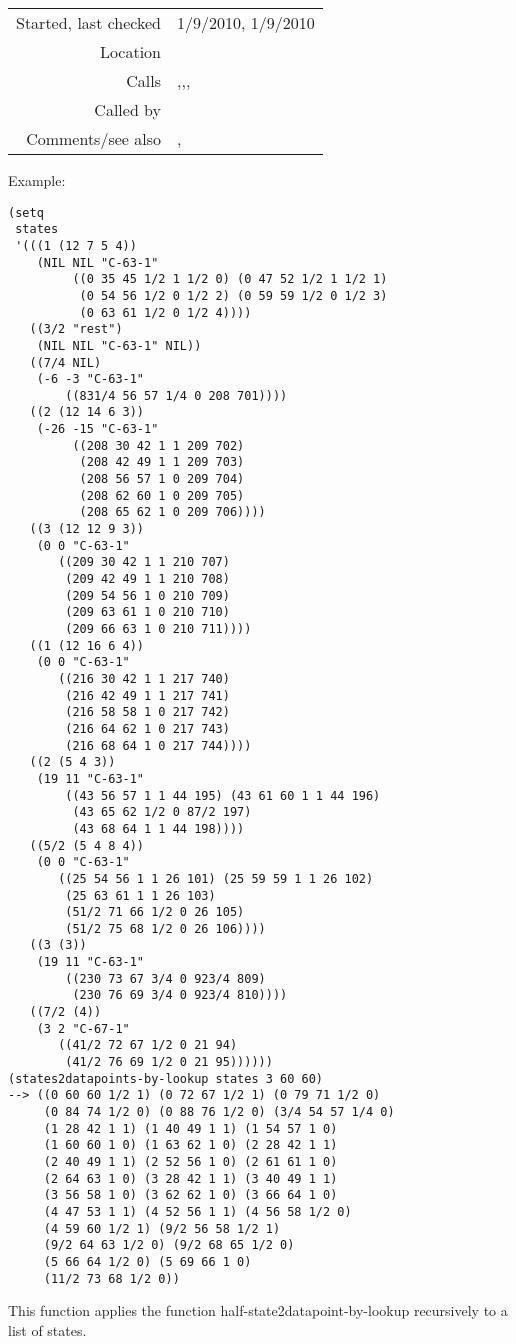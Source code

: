 \vspace{0.3cm}
\begin{tabular}{r|p{8cm}}
Started, last checked & 1/9/2010, 1/9/2010 \\
Location & \nameref{sec:realising-states} \\
Calls & \nameref{fun:create-MIDI-and-morphetic-numbers},\newline \nameref{fun:fibonacci-list},\newline \nameref{fun:half-state2datapoints-by-lookup},\newline \nameref{fun:state-durations-by-beat} \\
Called by & \\\
Comments/see also & \nameref{fun:states2datapoints},\newline \nameref{fun:states2datapoints-by-lookup<-}
\end{tabular}

\vspace{0.5cm}
\noindent Example:
\begin{verbatim}
(setq 
 states
 '(((1 (12 7 5 4))
    (NIL NIL "C-63-1"
         ((0 35 45 1/2 1 1/2 0) (0 47 52 1/2 1 1/2 1)
          (0 54 56 1/2 0 1/2 2) (0 59 59 1/2 0 1/2 3)
          (0 63 61 1/2 0 1/2 4))))
   ((3/2 "rest")
    (NIL NIL "C-63-1" NIL))
   ((7/4 NIL)
    (-6 -3 "C-63-1"
        ((831/4 56 57 1/4 0 208 701))))
   ((2 (12 14 6 3))
    (-26 -15 "C-63-1"
         ((208 30 42 1 1 209 702)
          (208 42 49 1 1 209 703)
          (208 56 57 1 0 209 704)
          (208 62 60 1 0 209 705)
          (208 65 62 1 0 209 706))))
   ((3 (12 12 9 3))
    (0 0 "C-63-1"
       ((209 30 42 1 1 210 707)
        (209 42 49 1 1 210 708)
        (209 54 56 1 0 210 709)
        (209 63 61 1 0 210 710)
        (209 66 63 1 0 210 711))))
   ((1 (12 16 6 4))
    (0 0 "C-63-1"
       ((216 30 42 1 1 217 740)
        (216 42 49 1 1 217 741)
        (216 58 58 1 0 217 742)
        (216 64 62 1 0 217 743)
        (216 68 64 1 0 217 744))))
   ((2 (5 4 3))
    (19 11 "C-63-1"
        ((43 56 57 1 1 44 195) (43 61 60 1 1 44 196)
         (43 65 62 1/2 0 87/2 197)
         (43 68 64 1 1 44 198))))
   ((5/2 (5 4 8 4))
    (0 0 "C-63-1"
       ((25 54 56 1 1 26 101) (25 59 59 1 1 26 102)
        (25 63 61 1 1 26 103)
        (51/2 71 66 1/2 0 26 105)
        (51/2 75 68 1/2 0 26 106))))
   ((3 (3))
    (19 11 "C-63-1"
        ((230 73 67 3/4 0 923/4 809)
         (230 76 69 3/4 0 923/4 810))))
   ((7/2 (4))
    (3 2 "C-67-1"
       ((41/2 72 67 1/2 0 21 94)
        (41/2 76 69 1/2 0 21 95))))))
(states2datapoints-by-lookup states 3 60 60)
--> ((0 60 60 1/2 1) (0 72 67 1/2 1) (0 79 71 1/2 0)
     (0 84 74 1/2 0) (0 88 76 1/2 0) (3/4 54 57 1/4 0)
     (1 28 42 1 1) (1 40 49 1 1) (1 54 57 1 0)
     (1 60 60 1 0) (1 63 62 1 0) (2 28 42 1 1)
     (2 40 49 1 1) (2 52 56 1 0) (2 61 61 1 0)
     (2 64 63 1 0) (3 28 42 1 1) (3 40 49 1 1)
     (3 56 58 1 0) (3 62 62 1 0) (3 66 64 1 0)
     (4 47 53 1 1) (4 52 56 1 1) (4 56 58 1/2 0)
     (4 59 60 1/2 1) (9/2 56 58 1/2 1)
     (9/2 64 63 1/2 0) (9/2 68 65 1/2 0)
     (5 66 64 1/2 0) (5 69 66 1 0)
     (11/2 73 68 1/2 0))
\end{verbatim}

\noindent This function applies the function
half-state2datapoint-by-lookup recursively to a list
of states.
















